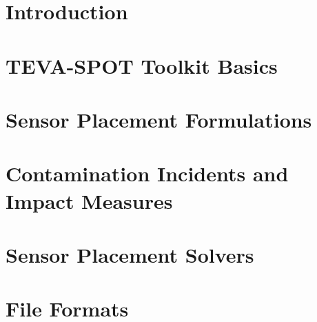 \chapter{Introduction}

\newpage
\chapter{TEVA-SPOT Toolkit Basics}

\clearpage
\chapter{Sensor Placement Formulations}

\clearpage
\chapter{Contamination Incidents and Impact Measures}

\clearpage
\chapter{Sensor Placement Solvers}

\clearpage
\chapter{File Formats}\label{fileFormats} 

